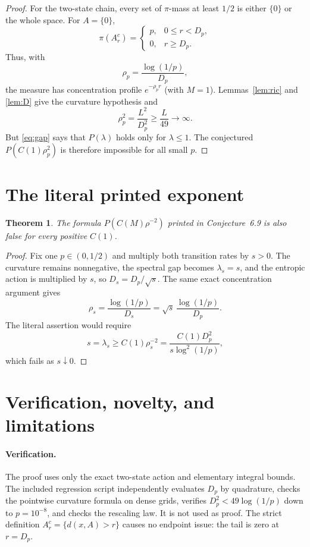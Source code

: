 \documentclass[11pt]{article}
\newtheorem{theorem}{Theorem}
\begin{document}
\begin{proof}
For the two-state chain, every set of $\pi$-mass at least $1/2$ is either
$\{0\}$ or the whole space. For $A=\{0\}$,
\[
 \pi(A_r^c)=
 \begin{cases}
 p,&0\leq r<D_p,\\
 0,&r\geq D_p.
 \end{cases}
\]
Thus, with
\[
                  \rho_p=\frac{\log(1/p)}{D_p},
\]
the measure has concentration profile $e^{-\rho_p r}$ (with $M=1$).
Lemmas~\ref{lem:ric} and \ref{lem:D} give the curvature hypothesis and
\[
                     \rho_p^2
     =\frac{L^2}{D_p^2}\geq\frac{L}{49}\longrightarrow\infty.
\]
But \eqref{eq:gap} says that $P(\lambda)$ holds only for $\lambda\leq1$.
The conjectured $P(C(1)\rho_p^2)$ is therefore impossible for all small $p$.
\end{proof}

\section{The literal printed exponent}

\begin{theorem}\label{thm:literal}
The formula $P(C(M)\rho^{-2})$ printed in Conjecture~6.9 is also false for
every positive $C(1)$.
\end{theorem}

\begin{proof}
Fix one $p\in(0,1/2)$ and multiply both transition rates by $s>0$.
The curvature remains nonnegative, the spectral gap becomes
$\lambda_s=s$, and the entropic action is multiplied by $s$, so
$D_s=D_p/\sqrt s$. The same exact concentration argument gives
\[
 \rho_s=\frac{\log(1/p)}{D_s}
       =\sqrt s\,\frac{\log(1/p)}{D_p}.
\]
The literal assertion would require
\[
 s=\lambda_s\geq C(1)\rho_s^{-2}
   =\frac{C(1)D_p^2}{s\log^2(1/p)},
\]
which fails as $s\downarrow0$.
\end{proof}

\section{Verification, novelty, and limitations}

\paragraph{Verification.}
The proof uses only the exact two-state action and elementary integral
bounds. The included regression script independently evaluates $D_p$ by
quadrature, checks the pointwise curvature formula on dense grids, verifies
$D_p^2<49\log(1/p)$ down to $p=10^{-8}$, and checks the rescaling law.
It is not used as proof. The strict definition
$A_r^c=\{d(x,A)>r\}$ causes no endpoint issue: the tail is zero at $r=D_p$.
\end{document}
